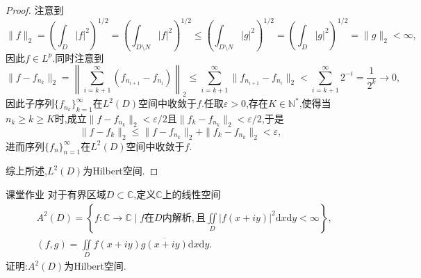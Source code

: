 \documentclass[lang = cn, scheme = chinese]{elegantbook}
\begin{document}
\begin{proof}
		注意到
		$$
		\|f\|_2
		=\left( \int_{D}|f|^2 \right)^{1/2}
		=\left( \int_{D\setminus N}|f|^2 \right)^{1/2}
		\le \left( \int_{D\setminus N}|g|^2 \right)^{1/2}
		=\left( \int_{D}|g|^2 \right)^{1/2}
		=\|g\|_2<\infty,
		$$
		因此$f\in L^p$.同时注意到
		$$
		\| f-f_{n_k} \|_2
		=\left\| \sum_{i=k+1}^{\infty}(f_{n_{i+1}}-f_{n_i}) \right\|_2
		\le \sum_{i=k+1}^{\infty}\| f_{n_{i+1}}-f_{n_i} \|_2
		< \sum_{i=k+1}^{\infty}2^{-i}=\frac{1}{2^k}\to0,
		$$
		因此子序列$\{f_{n_k}\}_{k=1}^{\infty}$在$L^2(D)$空间中收敛于$f$.任取$\varepsilon>0$,存在$K\in\mathbb{N}^*$,使得当$n_k\ge k\ge K$时,成立$\|f-f_{n_k}\|_2<\varepsilon/2$且$\|f_k-f_{n_k}\|_2<\varepsilon/2$,于是
		$$
		\|f-f_k\|_2\le\|f-f_{n_k}\|_2+\|f_k-f_{n_k}\|_2<\varepsilon,
		$$
		进而序列$\{f_n\}_{n=1}^{\infty}$在$L^2(D)$空间中收敛于$f$.
		
		综上所述,$L^2(D)$为Hilbert空间.
	\end{proof}
	
	\begin{proposition}{课堂作业}
		对于有界区域$D\subset \mathbb{C}$,定义$\mathbb{C}$上的线性空间
		\begin{align*}
			&A^2(D)=\left\{ f:\mathbb{C}\to\mathbb{C}\mid f\text{在}D\text{内解析},\text{且}\iint\limits_{D}|f(x+iy)|^2\mathrm{d}x\mathrm{d}y<\infty \right\},\\
			&(f,g)=\iint\limits_{D}f(x+iy)\overline{g(x+iy)}\mathrm{d}x\mathrm{d}y.
		\end{align*}
		证明:$A^2(D)$为Hilbert空间.
	\end{proposition}
	
\end{document}
